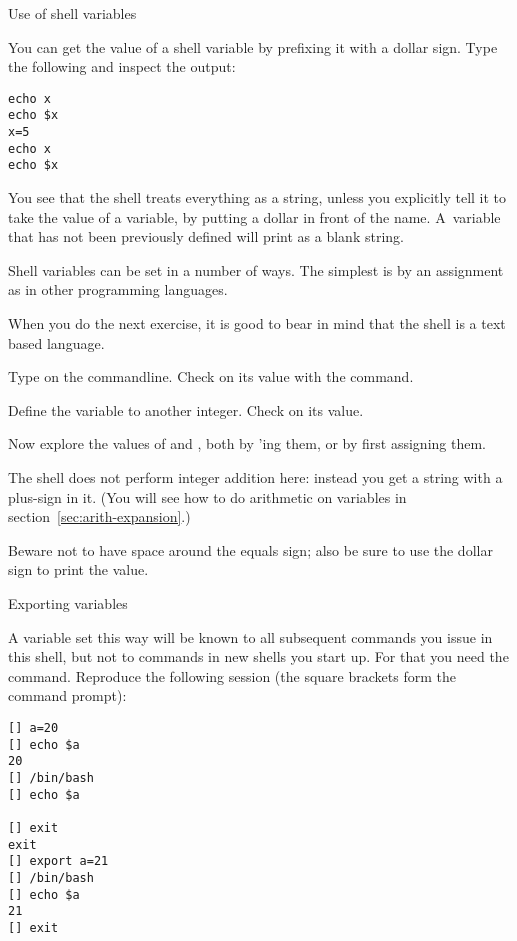  {Use of shell variables}

You can get the value of a shell variable by prefixing it with
a dollar sign.
Type the following and inspect the output:
\begin{verbatim}
echo x
echo $x
x=5
echo x
echo $x
\end{verbatim}

You see that the shell treats everything as a string, unless you explicitly tell it
to take the value of a variable, by putting a dollar in front of the name.
A~variable that has not been previously defined will print as a blank string.

Shell variables can be set in a number of ways. The simplest
is by an assignment as in other programming languages.

When you do the next exercise,
it is good to bear in mind that the shell is a text based language.

\begin{exercise}
  Type  on the commandline. Check on its value with the  command.

  Define the variable  to another integer. Check on its value.

  Now explore the values of  and , both by 'ing them,
  or by first assigning them.
\end{exercise}
\begin{outcome}
  The shell does not perform integer addition here: instead you get a string
  with a plus-sign in it.
  (You will see how to do arithmetic on variables in section~\ref{sec:arith-expansion}.)
\end{outcome}
\begin{caution}
  Beware not to have space
    around the equals sign; also be sure to use the dollar sign to print
    the value.
\end{caution}

 {Exporting variables}

A variable set this way will be known to all subsequent commands
you issue in this shell, but not to commands in new shells you start up.
For that you need the  command.
Reproduce the following session (the square brackets form the command prompt):
\begin{verbatim}
[] a=20
[] echo $a
20
[] /bin/bash
[] echo $a

[] exit
exit
[] export a=21
[] /bin/bash
[] echo $a
21
[] exit
\end{verbatim}

